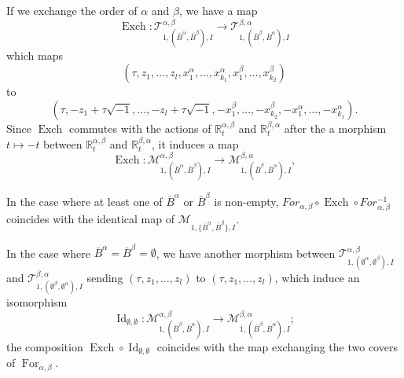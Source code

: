 \documentclass[11pt,a4paper]{article}
\theoremstyle{definition}
\theoremstyle{remark}
\numberwithin{equation}{section}
\DeclareMathOperator{\Id}{Id}
\begin{document}
If we exchange the order of $\alpha$ and $\beta$, we have a map
$$
\operatorname{Exch}\colon\mathcal T^{\alpha,\beta}_{1,(\bar{B}^\alpha,\bar{B}^\beta),I}\to \mathcal T^{\beta,\alpha}_{1,(\bar{B}^\beta,\bar{B}^\alpha),I}
$$
which maps
$$
(\tau,z_1,\dots,z_l,x^\alpha_1,\dots,x^\alpha_{k_1},x^\beta_1,\dots,x^\beta_{k_2})$$ to 
\begin{equation}\label{eq def of exchange before quotient}
(\tau,-z_1+\tau\sqrt{-1},\dots,-z_l+\tau\sqrt{-1},-x^\beta_1,\dots,-x^\beta_{k_2},-x^\alpha_1,\dots,-x^\alpha_{k_1}).
\end{equation}
Since $\operatorname{Exch}$ commutes with the actions of $\mathbb R_t^{\alpha,\beta}$ and $\mathbb R_t^{\beta,\alpha}$ after the a morphism $t\mapsto -t$ between $\mathbb R_t^{\alpha,\beta}$ and $\mathbb R_t^{\beta,\alpha}$, it induces a map $$\operatorname{Exch}\colon\mathcal M^{\alpha,\beta}_{1,(\bar{B}^\alpha,\bar{B}^\beta),I}\to \mathcal M^{\beta,\alpha}_{1,(\bar{B}^\beta,\bar{B}^\alpha),I},$$ 

In the case where at least one of $\bar{B}^\alpha$ or $\bar{B}^\beta$ is non-empty, $For_{\alpha,\beta}\circ \operatorname{Exch} \circ For^{-1}_{\alpha,\beta}$ coincides with the identical map of $\mathcal M_{1,\{\bar{B}^\alpha,\bar{B}^\beta\},I}$.

In the case where $\bar{B}^\alpha=\bar{B}^\beta=\emptyset$, we have another morphism between $\mathcal T^{\alpha,\beta}_{1,(\emptyset^\alpha,\emptyset^\beta),I}$ and $\mathcal T^{\beta,\alpha}_{1,(\emptyset^\beta,\emptyset^\alpha),I}$ sending $(\tau,z_1,\dots,z_l)$ to $(\tau,z_1,\dots,z_l)$, which induce an isomorphism 
$$\Id_{\emptyset,\emptyset} \colon \mathcal M^{\alpha,\beta}_{1,(\bar{B}^\beta,\bar{B}^\alpha),I} \to \mathcal M^{\beta,\alpha}_{1,(\bar{B}^\beta,\bar{B}^\alpha),I};$$
the composition $\operatorname{Exch}\circ \Id_{\emptyset,\emptyset}$
 coincides with the map exchanging the two covers of $\operatorname{For}_{\alpha,\beta}$.
\end{document}
